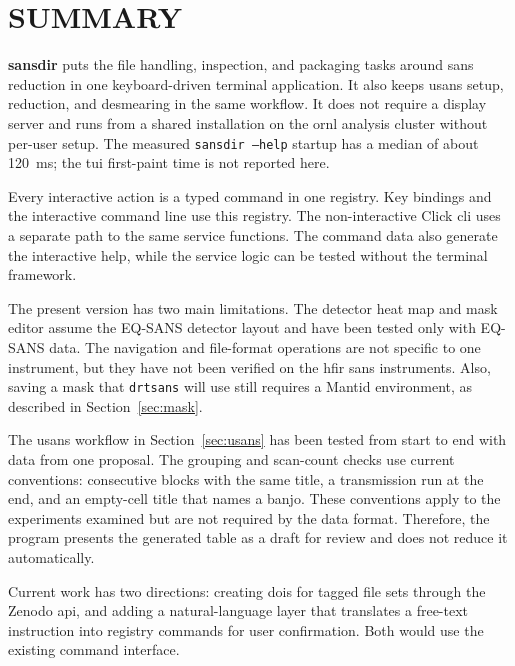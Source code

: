 \documentclass[tm]{ornltm}
\begin{document}
\section{SUMMARY}
\label{sec:future}

\textbf{sansdir} puts the file handling, inspection, and packaging tasks around
\ac{sans} reduction in one keyboard-driven terminal application. It also keeps
\ac{usans} setup, reduction, and desmearing in the same workflow. It does not
require a display server and runs from a shared installation on the \ac{ornl}
analysis cluster without per-user setup. The measured
\texttt{sansdir --help} startup has a median of about 120~ms; the \ac{tui}
first-paint time is not reported here.

Every interactive action is a typed command in one registry. Key bindings and
the interactive command line use this registry. The non-interactive Click
\ac{cli} uses a separate path to the same service functions. The command data
also generate the interactive help, while the service logic can be tested
without the terminal framework.

The present version has two main limitations. The detector heat map and mask
editor assume the EQ-SANS detector layout and have been tested only with
EQ-SANS data. The navigation and file-format operations are not specific to one
instrument, but they have not been verified on the \ac{hfir} \ac{sans}
instruments. Also, saving a mask that \texttt{drtsans} will use still requires a
Mantid environment, as described in Section~\ref{sec:mask}.

The \ac{usans} workflow in Section~\ref{sec:usans} has been tested from start to
end with data from one proposal. The grouping and scan-count checks use current
conventions: consecutive blocks with the same title, a transmission run at the
end, and an empty-cell title that names a banjo. These conventions apply to the
experiments examined but are not required by the data format. Therefore, the
program presents the generated table as a draft for review and does not reduce
it automatically.

Current work has two directions: creating \acp{doi} for tagged file sets through
the Zenodo \ac{api}, and adding a natural-language layer that translates a
free-text instruction into registry commands for user confirmation. Both would
use the existing command interface.

\end{document}
